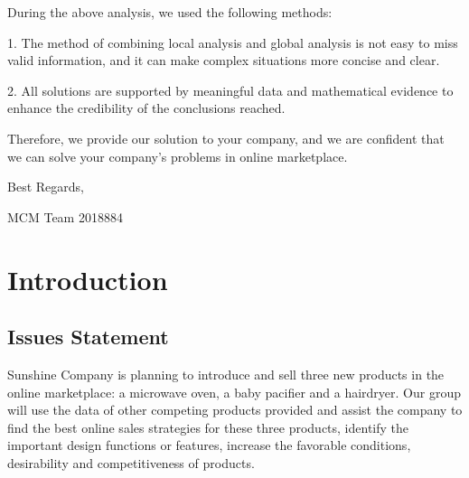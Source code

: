 \documentclass[12pt]{article}
\begin{document}
\par
During the above analysis, we used the following methods:
\par
1. The method of combining local analysis and global analysis is not easy to miss valid information, and it can make complex situations more concise and clear.
\par
2. All solutions are supported by meaningful data and mathematical evidence to enhance the credibility of the conclusions reached.
\par
Therefore, we provide our solution to your company, and we are confident that we can solve your company's problems in online marketplace.
\par
\quad
\par
\quad
\par
\quad
\par
\quad
\par
\quad\quad\quad\quad\quad\quad\quad\quad\quad\quad\quad\quad\quad\quad
\quad\quad\quad\quad\quad\quad\quad\quad\quad\quad\quad\quad\quad\quad
Best Regards,
\newline
\par
\quad\quad\quad\quad\quad\quad\quad\quad\quad\quad\quad\quad\quad\quad
\quad\quad\quad\quad\quad\quad\quad\quad\quad\quad\quad\quad\quad\quad
MCM Team 2018884



\newpage
\begin{center}
\tableofcontents
\end{center}


\clearpage
\pagestyle{fancy}
\newpage
\setcounter{page}{1}
\newpage
\section{Introduction}
\subsection{Issues Statement}
\quad\par\par
Sunshine Company is planning to introduce and sell three new products in the online marketplace: a microwave oven, a baby pacifier and a hairdryer. Our group will use the data of other competing products provided and assist the company to find the best online sales strategies for these three products, identify the important design functions or features, increase the favorable conditions, desirability and competitiveness of products.
\end{document}
